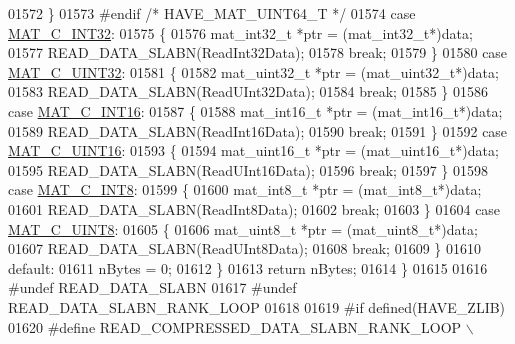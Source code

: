 \begin{DoxyCode}
{{{{{01572         \}
01573 \textcolor{preprocessor}{#endif }\textcolor{comment}{/* HAVE\_MAT\_UINT64\_T */}\textcolor{preprocessor}{}
01574         \textcolor{keywordflow}{case} \hyperlink{group___m_a_t_ggad4d60ae7b709fc81bfd744fb4c857c40adb44fc39694e3152ae5e69470a2fefe8}{MAT\_C\_INT32}:
01575         \{
01576             mat\_int32\_t *ptr = (mat\_int32\_t*)data;
01577             READ\_DATA\_SLABN(ReadInt32Data);
01578             \textcolor{keywordflow}{break};
01579         \}
01580         \textcolor{keywordflow}{case} \hyperlink{group___m_a_t_ggad4d60ae7b709fc81bfd744fb4c857c40a9a17a7edd45b19ef68197db81b27e816}{MAT\_C\_UINT32}:
01581         \{
01582             mat\_uint32\_t *ptr = (mat\_uint32\_t*)data;
01583             READ\_DATA\_SLABN(ReadUInt32Data);
01584             \textcolor{keywordflow}{break};
01585         \}
01586         \textcolor{keywordflow}{case} \hyperlink{group___m_a_t_ggad4d60ae7b709fc81bfd744fb4c857c40a40370e9de516c5036a67a5865c071006}{MAT\_C\_INT16}:
01587         \{
01588             mat\_int16\_t *ptr = (mat\_int16\_t*)data;
01589             READ\_DATA\_SLABN(ReadInt16Data);
01590             \textcolor{keywordflow}{break};
01591         \}
01592         \textcolor{keywordflow}{case} \hyperlink{group___m_a_t_ggad4d60ae7b709fc81bfd744fb4c857c40a8bede21dbf6c1edc0bbccc1481bccae7}{MAT\_C\_UINT16}:
01593         \{
01594             mat\_uint16\_t *ptr = (mat\_uint16\_t*)data;
01595             READ\_DATA\_SLABN(ReadUInt16Data);
01596             \textcolor{keywordflow}{break};
01597         \}
01598         \textcolor{keywordflow}{case} \hyperlink{group___m_a_t_ggad4d60ae7b709fc81bfd744fb4c857c40a984ff310f9e906100fcff95f704f43c5}{MAT\_C\_INT8}:
01599         \{
01600             mat\_int8\_t *ptr = (mat\_int8\_t*)data;
01601             READ\_DATA\_SLABN(ReadInt8Data);
01602             \textcolor{keywordflow}{break};
01603         \}
01604         \textcolor{keywordflow}{case} \hyperlink{group___m_a_t_ggad4d60ae7b709fc81bfd744fb4c857c40a81270f8093cb4808e992c1d29d84d4e3}{MAT\_C\_UINT8}:
01605         \{
01606             mat\_uint8\_t *ptr = (mat\_uint8\_t*)data;
01607             READ\_DATA\_SLABN(ReadUInt8Data);
01608             \textcolor{keywordflow}{break};
01609         \}
01610         \textcolor{keywordflow}{default}:
01611             nBytes = 0;
01612     \}
01613     \textcolor{keywordflow}{return} nBytes;
01614 \}
01615 
01616 \textcolor{preprocessor}{#undef READ\_DATA\_SLABN}
01617 \textcolor{preprocessor}{#undef READ\_DATA\_SLABN\_RANK\_LOOP}
01618 
01619 \textcolor{preprocessor}{#if defined(HAVE\_ZLIB)}
01620 \textcolor{preprocessor}{#define READ\_COMPRESSED\_DATA\_SLABN\_RANK\_LOOP \(\backslash\)}
}}}}}
\end{DoxyCode}
